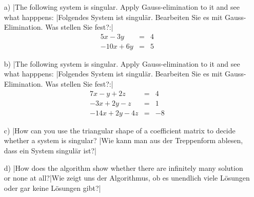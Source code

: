 \begin{exer}$ $
\begin{itemize}
\item[a)] \tr|The following system is singular. Apply Gauss-elimination to it and see what happpens: |Folgendes System ist singulär. Bearbeiten Sie es mit Gauss-Elimination. Was stellen Sie fest?:|
\[
\begin{array}{rcl}
5x-3y&=&4\\
-10x+6y&=&5
\end{array}
\]
\vspace{3cm}

\item[b)] \tr|The following system is singular. Apply Gauss-elimination to it and see what happpens: |Folgendes System ist singulär. Bearbeiten Sie es mit Gauss-Elimination. Was stellen Sie fest?:|
\[
\begin{array}{rcl}
7x-y+2z&=&4\\
-3x+2y-z&=&1\\
-14x+2y-4z&=&-8
\end{array}
\]
\vspace{3cm}

\item[c)] \tr|How can you use the triangular shape of a coefficient matrix to decide whether a system is singular? |Wie kann man aus der Treppenform ablesen, dass ein System singulär ist?|
\vspace{4cm}

\item[d)] \tr|How does the algorithm show whether there are infinitely many solution or none at all?|Wie zeigt uns der Algorithmus, ob es unendlich viele Lösungen oder gar keine Lösungen gibt?|
\vspace{4cm}

\end{itemize}
\end{exer}


\newpage

